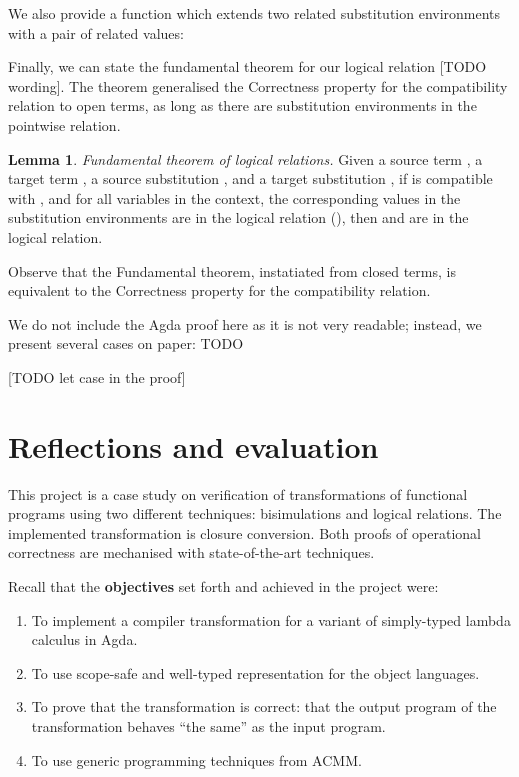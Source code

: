 \documentclass[bsc,frontabs,oneside,singlespacing,parskip,deptreport]{infthesis}
\theoremstyle{definition}
\theoremstyle{lemma}
\newtheorem*{lemma}{Lemma}
\begin{document}

We also provide a function  which extends two related
substitution environments with a pair of related values:


Finally, we can state the fundamental theorem for our logical
relation [TODO wording]. The theorem generalised the Correctness
property for the compatibility relation to open terms, as long as
there are substitution environments in the pointwise relation.

\begin{lemma}
  \emph{Fundamental theorem of logical relations.} Given a source
  term , a target term , a source substitution
  , and a target substitution , if  is
  compatible with , and for all variables  in the
  context, the corresponding values in the substitution environments
  are in the logical relation (), then
   and  are in the
  logical relation.
\end{lemma}


Observe that the Fundamental theorem, instatiated from closed terms,
is equivalent to the Correctness property for the compatibility relation.

We do not include the Agda proof here as it is not very readable;
instead, we present several cases on paper: TODO

[TODO let case in the proof]

\chapter{Reflections and evaluation}
\label{cha:refl-eval}

This project is a case study on verification of transformations of
functional programs using two different techniques: bisimulations and
logical relations. The implemented transformation is closure
conversion. Both proofs of operational correctness are mechanised with
state-of-the-art techniques.

Recall that the \textbf{objectives} set forth and achieved in the
project were:

\begin{enumerate}
\item To implement a compiler transformation for a variant of
  simply-typed lambda calculus in Agda.
\item To use scope-safe and well-typed representation for the object
  languages.
\item To prove that the transformation is correct: that the output
  program of the transformation behaves ``the same'' as the input
  program.
\item To use generic programming techniques from ACMM.
\end{enumerate}
\end{document}
